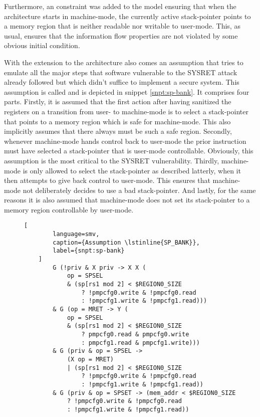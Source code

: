 Furthermore, an  constraint was added to the model ensuring that when the architecture starts in machine-mode, the currently active stack-pointer points to a memory region that is neither readable nor writable to user-mode.
This, as usual, ensures that the information flow properties are not violated by some obvious initial condition.

With the extension to the architecture also comes an assumption that tries to emulate all the major steps that software vulnerable to the SYSRET attack already followed but which didn't suffice to implement a secure system.
This assumption is called  and is depicted in snippet \ref{snpt:sp-bank}.
It comprises four parts.
Firstly, it is assumed that the first action after having sanitized the registers on a transition from user- to machine-mode is to select a stack-pointer that points to a memory region which is safe for machine-mode.
This also implicitly assumes that there always must be such a safe region.
Secondly, whenever machine-mode hands control back to user-mode the prior instruction must have selected a stack-pointer that is user-mode controllable.
Obviously, this assumption is the most critical to the SYSRET vulnerability.
Thirdly, machine-mode is only allowed to select the stack-pointer as described latterly, when it then attempts to give back control to user-mode.
This ensures that machine-mode not deliberately decides to use a bad stack-pointer.
And lastly, for the same reasons it is also assumed that machine-mode does not set its stack-pointer to a memory region controllable by user-mode.

\begin{figure}
    \begin{lstlisting}[
        language=smv,
        caption={Assumption \lstinline{SP_BANK}},
        label={snpt:sp-bank}
    ]
        G (!priv & X priv -> X X (
            op = SPSEL
            & (sp[rs1 mod 2] < $REGION0_SIZE
                ? !pmpcfg0.write & !pmpcfg0.read
                : !pmpcfg1.write & !pmpcfg1.read)))
        & G (op = MRET -> Y (
            op = SPSEL
            & (sp[rs1 mod 2] < $REGION0_SIZE
                ? pmpcfg0.read & pmpcfg0.write
                : pmpcfg1.read & pmpcfg1.write)))
        & G (priv & op = SPSEL ->
            (X op = MRET)
            | (sp[rs1 mod 2] < $REGION0_SIZE
                ? !pmpcfg0.write & !pmpcfg0.read
                : !pmpcfg1.write & !pmpcfg1.read))
        & G (priv & op = SPSET -> (mem_addr < $REGION0_SIZE
            ? !pmpcfg0.write & !pmpcfg0.read
            : !pmpcfg1.write & !pmpcfg1.read))
    \end{lstlisting}
\end{figure}

